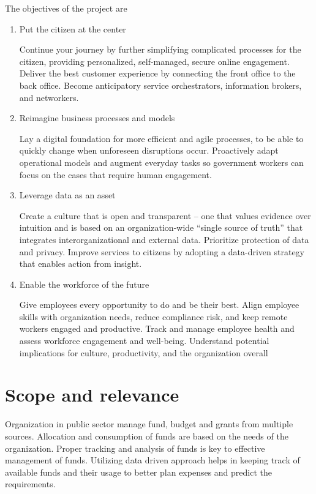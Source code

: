 The objectives of the project are
\begin{enumerate}
\item Put the citizen at the center

Continue your journey by further simplifying complicated
processes for the citizen, providing personalized, self-managed,
secure online engagement. Deliver the best customer experience
by connecting the front office to the back office. Become
anticipatory service orchestrators, information brokers, and
networkers.
\item Reimagine business processes and models

Lay a digital foundation for more efficient and agile processes,
to be able to quickly change when unforeseen disruptions
occur. Proactively adapt operational models and augment
everyday tasks so government workers can focus on the cases
that require human engagement.

\item Leverage data as an asset

Create a culture that is open and transparent – one that values
evidence over intuition and is based on an organization-wide
“single source of truth” that integrates interorganizational and
external data. Prioritize protection of data and privacy. Improve
services to citizens by adopting a data-driven strategy that
enables action from insight.

\item Enable the workforce of the future

Give employees every opportunity to do and be their best. Align
employee skills with organization needs, reduce compliance risk,
and keep remote workers engaged and productive. Track and
manage employee health and assess workforce engagement
and well-being. Understand potential implications for culture,
productivity, and the organization overall
\end{enumerate}

\section[Scope and relevance]{\textbf{Scope and relevance}}
Organization in public sector manage fund, budget and grants from multiple sources.
Allocation and consumption of funds are based on the needs of the organization.
Proper tracking and analysis of funds is key to effective management of funds.
Utilizing data driven approach helps in keeping track of available funds and their usage 
to better plan expenses and predict the requirements.  



